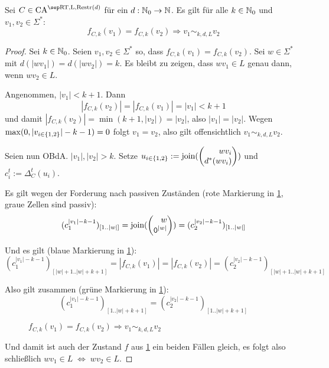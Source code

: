 \begin{satz}
    \label{satzFEqualsImpliesEquiv}
    Sei $C \in \CAM{\CART, \CALeft, \CARestr(d)}$ für ein $d: \mathbb{N}_0 \to \mathbb{N}$. Es gilt für alle $k \in \mathbb{N}_0$ und $v_1, v_2 \in \Sigma^*$:
    \[
        f_{C, k}(v_1) = f_{C, k}(v_2) \Rightarrow v_1 \sim_{k,d,L} v_2
    \]
\end{satz}
\begin{proof}
    Sei $k \in \mathbb{N}_0$. Seien $v_1, v_2 \in \Sigma^*$ so, dass $f_{C, k}(v_1) = f_{C, k}(v_2)$.
    Sei $w \in \Sigma^*$ mit $d(|wv_1|) = d(|wv_2|) = k$.
    Es bleibt zu zeigen, dass $wv_1 \in L$ genau dann, wenn $wv_2 \in L$.
    
    Angenommen, $|v_1| < k + 1$. Dann 
    \[
        |f_{C, k}(v_2)| = |f_{C, k}(v_1)| = |v_1| < k + 1
    \]
    und damit $|f_{C, k}(v_2)| = \min(k+1, |v_2|) = |v_2|$, also $|v_1| = |v_2|$.
    Wegen $\max(0, |v_{i \in \{ {1,2} \}}|-k-1) = 0$ folgt $v_1 = v_2$, also gilt offensichtlich $v_1 \sim_{k,d,L} v_2$.
    
    Seien nun \acs{OBdA.} $|v_1|, |v_2| > k$.
    Setze $u_{i \in \finset{1, 2}} := \comb(\Spvek{ wv_i; d^*(wv_i) })$
    und $c^t_i := \Delta_C^{t}( u_i )$.
    
    Es gilt wegen der Forderung nach passiven Zuständen (rote Markierung in \cref{fig:RestrAutomata_fCk_Equiv}, graue Zellen sind passiv): 
    \[(c_1^{|v_1|-k-1})_{[1..|w|]} = \comb(\Spvek{ w; \chr{0}^{|w|} }) = (c_2^{|v_2|-k-1})_{[1..|w|]}\]
    
    Und es gilt (blaue Markierung in \cref{fig:RestrAutomata_fCk_Equiv}): 
    \[(c_1^{|v_1|-k-1})_{[|w|+1..|w|+k+1]} = |f_{C, k}(v_1)| = |f_{C, k}(v_2)| = (c_2^{|v_2|-k-1})_{[|w|+1..|w|+k+1]}\]
    
    
    Also gilt zusammen (grüne Markierung in \cref{fig:RestrAutomata_fCk_Equiv}): 
    \[(c_1^{|v_1|-k-1})_{[1..|w|+k+1]} = (c_2^{|v_2|-k-1})_{[1..|w|+k+1]}\]
    
    \begin{figure}[h!]
        \centering
        
        \caption{$f_{C,k}(v_1) = f_{C,k}(v_2) \Rightarrow v_1 \sim_{k,d,L} v_2$}
        \label{fig:RestrAutomata_fCk_Equiv}
    \end{figure}
    
    Und damit ist auch der Zustand $f$ aus \cref{fig:RestrAutomata_fCk_Equiv} ein beiden Fällen gleich,
    es folgt also schließlich $wv_1 \in L \; \Leftrightarrow \; wv_2 \in L$.
\end{proof}

